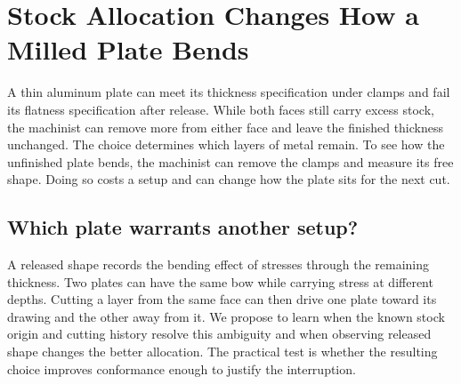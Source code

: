 \documentclass[11pt,letterpaper]{article}
\begin{document}
\section*{Stock Allocation Changes How a Milled Plate Bends}

A thin aluminum plate can meet its thickness specification under clamps and fail its flatness specification after release. While both faces still carry excess stock, the machinist can remove more from either face and leave the finished thickness unchanged. The choice determines which layers of metal remain. To see how the unfinished plate bends, the machinist can remove the clamps and measure its free shape. Doing so costs a setup and can change how the plate sits for the next cut.

\subsection*{Which plate warrants another setup?}

A released shape records the bending effect of stresses through the remaining thickness. Two plates can have the same bow while carrying stress at different depths. Cutting a layer from the same face can then drive one plate toward its drawing and the other away from it. We propose to learn when the known stock origin and cutting history resolve this ambiguity and when observing released shape changes the better allocation. The practical test is whether the resulting choice improves conformance enough to justify the interruption.

\begin{center}


\end{center}
\end{document}
